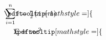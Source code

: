 \documentclass{article}
\begin{document}
\begin{align*}
  \mathrlap{\pdftooltip[mathstyle=\displaystyle]{\phantom{\sum_{i=1}^n i=\frac{n}{2}(n+1)}}{sum\string_\{i=1\}\string^n i=tfrac\{n\}\{2\}(n+1)}}%
  \sum_{i=1}^n i &= \tfrac{n}{2}(n+1) \\
  \mathrlap{\pdftooltip[mathstyle=\displaystyle]{\phantom{E=mc^2}}{E=mc\textasciicircum 2}}%
  E &= mc^2
\end{align*}
\end{document}
